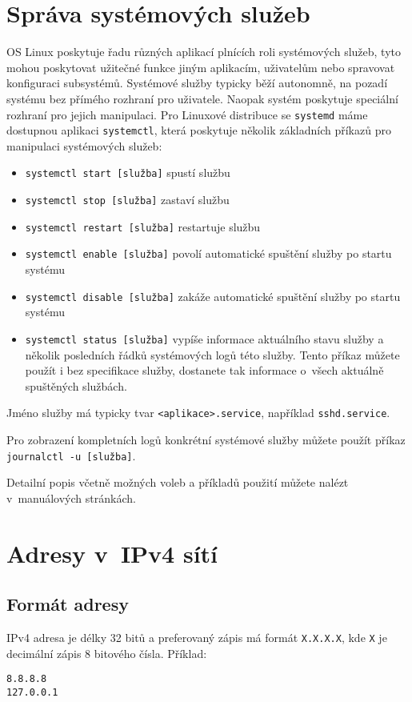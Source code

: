 \section{Správa systémových služeb}
\label{sluzby}

OS Linux poskytuje řadu různých aplikací plnících roli systémových služeb, tyto
mohou poskytovat užitečné funkce jiným aplikacím, uživatelům nebo spravovat
konfiguraci subsystémů. Systémové služby typicky běží autonomně, na pozadí
systému bez přímého rozhraní pro uživatele. Naopak systém poskytuje speciální
rozhraní pro jejich manipulaci. Pro Linuxové distribuce se \texttt{systemd} máme
dostupnou aplikaci \texttt{systemctl}, která poskytuje několik základních
příkazů pro manipulaci systémových služeb:
\begin{itemize}
    \item \texttt{systemctl start [služba]} spustí službu
    \item \texttt{systemctl stop [služba]} zastaví službu
    \item \texttt{systemctl restart [služba]} restartuje službu
    \item \texttt{systemctl enable [služba]} povolí automatické spuštění služby
        po startu systému
    \item \texttt{systemctl disable [služba]} zakáže automatické spuštění
        služby po startu systému
    \item \texttt{systemctl status [služba]} vypíše informace aktuálního stavu
        služby a několik posledních řádků systémových logů této služby. Tento
        příkaz můžete použít i bez specifikace služby, dostanete tak informace
        o~všech aktuálně spuštěných službách.
\end{itemize}

Jméno služby má typicky tvar \texttt{<aplikace>.service}, například
\texttt{sshd.service}.

Pro zobrazení kompletních logů konkrétní systémové služby můžete použít příkaz
\texttt{journalctl -u [služba]}.

Detailní popis včetně možných voleb a příkladů použití můžete nalézt
v~manuálových stránkách.

\section{Adresy v~IPv4 sítí}\label{adresy_ipv4}

\subsection{Formát adresy}
IPv4 adresa je délky 32 bitů a preferovaný zápis má formát {\tt X.X.X.X}, kde
{\tt X} je decimální zápis 8 bitového čísla. Příklad:\\
\begin{verbatim}
8.8.8.8
127.0.0.1
\end{verbatim}

